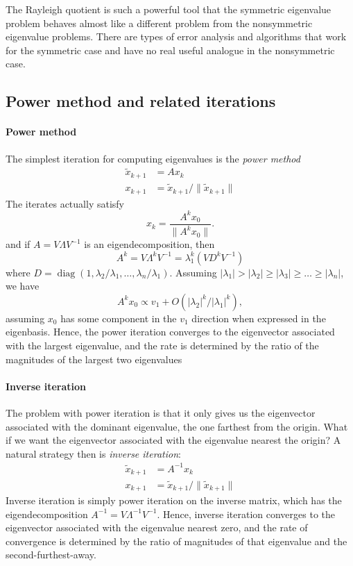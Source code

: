 \documentclass[12pt, leqno]{article}
\begin{document}
The Rayleigh quotient is such a powerful tool that the symmetric
eigenvalue problem behaves almost like a different problem from
the nonsymmetric eigenvalue problems.  There are types of error
analysis and algorithms that work for the symmetric case and have
no real useful analogue in the nonsymmetric case.

\subsection{Power method and related iterations}

\paragraph{Power method}
The simplest iteration for computing eigenvalues is the {\em power
  method}
\begin{align*}
  \tilde{x}_{k+1} &= A x_k \\
  x_{k+1} &= \tilde{x}_{k+1}/\|\tilde{x}_{k+1}\|
\end{align*}
The iterates actually satisfy
\[
  x_{k} = \frac{A^k x_0}{\|A^k x_0\|}.
\]
and if $A = V \Lambda V^{-1}$ is an eigendecomposition, then
\[
  A^k = V \Lambda^k V^{-1} = \lambda_1^k (V D^k V^{-1})
\]
where
$D = \operatorname{diag}(1, \lambda_2/\lambda_1, \ldots, \lambda_n/\lambda_1)$.
Assuming $|\lambda_1| > |\lambda_2| \geq |\lambda_3| \geq \ldots \geq
|\lambda_n|$, we have
\[
  A^k x_0 \propto v_1 + O\left( |\lambda_2|^k/|\lambda_1|^k \right),
\]
assuming $x_0$ has some component in the $v_1$ direction when
expressed in the eigenbasis.  Hence, the power iteration converges
to the eigenvector associated with the largest eigenvalue, and the
rate is determined by the ratio of the magnitudes of the largest two
eigenvalues

\paragraph{Inverse iteration}
The problem with power iteration is that it only gives us the
eigenvector associated with the dominant eigenvalue, the one farthest
from the origin.  What if we want the eigenvector associated with the
eigenvalue nearest the origin?  A natural strategy then is {\em
  inverse iteration}:
\begin{align*}
  \tilde{x}_{k+1} &= A^{-1} x_k \\
  x_{k+1} &= \tilde{x}_{k+1}/\|\tilde{x}_{k+1}\|
\end{align*}
Inverse iteration is simply power iteration on the inverse matrix,
which has the eigendecomposition $A^{-1} = V \Lambda^{-1} V^{-1}$.
Hence, inverse iteration converges to the eigenvector associated with
the eigenvalue nearest zero, and the rate of convergence is determined
by the ratio of magnitudes of that eigenvalue and the second-furthest-away.
\end{document}
